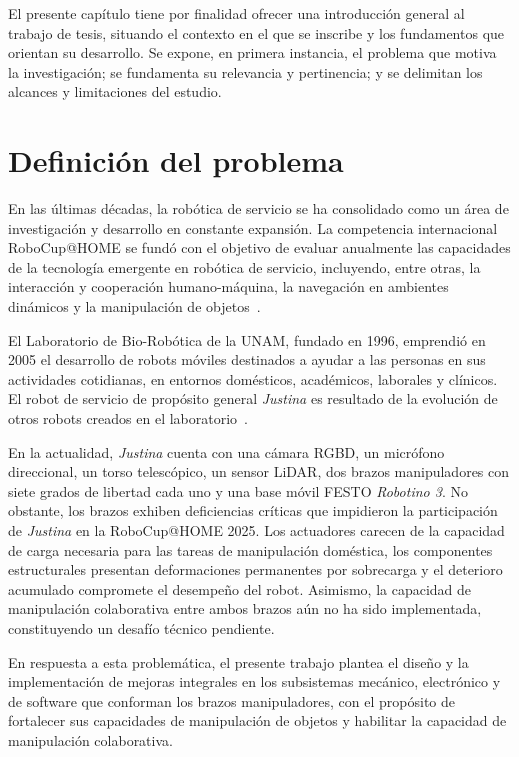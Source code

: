 El presente capítulo tiene por finalidad ofrecer una introducción general al trabajo de tesis, situando el contexto en el que se inscribe y los fundamentos que orientan su desarrollo. Se expone, en primera instancia, el problema que motiva la investigación; se fundamenta su relevancia y pertinencia; y se delimitan los alcances y limitaciones del estudio.

\section{Definición del problema}

En las últimas décadas, la robótica de servicio se ha consolidado como un área de investigación y desarrollo en constante expansión. La competencia internacional RoboCup@HOME se fundó con el objetivo de evaluar anualmente las capacidades de la tecnología emergente en robótica de servicio, incluyendo, entre otras, la interacción y cooperación humano-máquina, la navegación en ambientes dinámicos y la manipulación de objetos~\cite{robocup_athome}. 

El Laboratorio de Bio-Robótica de la UNAM, fundado en 1996, emprendió en 2005 el desarrollo de robots móviles destinados a ayudar a las personas en sus actividades cotidianas, en entornos domésticos, académicos, laborales y clínicos. El robot de servicio de propósito general \emph{Justina} es resultado de la evolución de otros robots creados en el laboratorio~\cite{justina_uv}.

En la actualidad, \emph{Justina} cuenta con una cámara RGBD, un micrófono direccional, un torso telescópico, un sensor LiDAR, dos brazos manipuladores con siete grados de libertad cada uno y una base móvil FESTO \emph{Robotino 3}. No obstante, los brazos exhiben deficiencias críticas que impidieron la participación de \emph{Justina} en la RoboCup@HOME 2025. Los actuadores carecen de la capacidad de carga necesaria para las tareas de manipulación doméstica, los componentes estructurales presentan deformaciones permanentes por sobrecarga y el deterioro acumulado compromete el desempeño del robot. Asimismo, la capacidad de manipulación colaborativa entre ambos brazos aún no ha sido implementada, constituyendo un desafío técnico pendiente.

En respuesta a esta problemática, el presente trabajo plantea el diseño y la implementación de mejoras integrales en los subsistemas mecánico, electrónico y de software que conforman los brazos manipuladores, con el propósito de fortalecer sus capacidades de manipulación de objetos y habilitar la capacidad de manipulación colaborativa.

